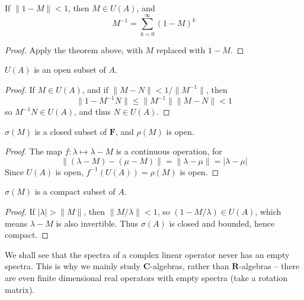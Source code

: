 \begin{corollary}
    If $\| 1 - M \| < 1$, then $M \in U(A)$, and
    \[ M^{-1} = \sum_{k = 0}^\infty (1 - M)^k \]
\end{corollary}
\begin{proof}
    Apply the theorem above, with $M$ replaced with $1 - M$.
\end{proof}

\begin{corollary}
    $U(A)$ is an open subset of $A$.
\end{corollary}
\begin{proof}
    If $M \in U(A)$, and if $\| M - N \| < 1/\| M^{-1} \|$, then 
    \[ \| 1 - M^{-1}N \| \leq \| M^{-1} \| \| M - N \|  < 1 \]
    so $M^{-1}N \in U(A)$, and thus $N \in U(A)$.
\end{proof}

\begin{corollary}
    $\sigma(M)$ is a closed subset of $\mathbf{F}$, and $\rho(M)$ is open.
\end{corollary}
\begin{proof}
    The map $f: \lambda \mapsto \lambda - M$ is a continuous operation, for
    \[ \| (\lambda - M) - (\mu - M) \| = \| \lambda - \mu \| = | \lambda - \mu | \]
    Since $U(A)$ is open, $f^{-1}(U(A)) = \rho(M)$ is open.
\end{proof}

\begin{theorem}
    $\sigma(M)$ is a compact subset of $A$.
\end{theorem}
\begin{proof}
    If $|\lambda| > \|M\|$, then $\| M/\lambda \| < 1$, so $(1 - M/\lambda) \in U(A)$, which means $\lambda - M$ is also invertible. Thus $\sigma(A)$ is closed and bounded, hence compact.
\end{proof}

We shall see that the spectra of a complex linear operator never has an empty spectra. This is why we mainly study $\mathbf{C}$-algebras, rather than $\mathbf{R}$-algebras -- there are even finite dimensional real operators with empty spectra (take a rotation matrix).

